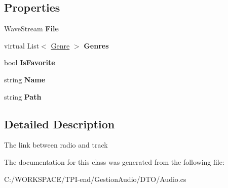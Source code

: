 \subsection*{Properties}
\begin{DoxyCompactItemize}
\item 
\mbox{\label{class_d_t_o_1_1_audio_a796dba75af345fa61826412a15b4f199}} 
Wave\+Stream {\bfseries File}
\item 
\mbox{\label{class_d_t_o_1_1_audio_a64baf5725332a6021eb88a2756f0f445}} 
virtual List$<$ \hyperlink{class_d_t_o_1_1_entity_1_1_genre}{Genre} $>$ {\bfseries Genres}
\item 
\mbox{\label{class_d_t_o_1_1_audio_acdff662b62eb37a7fe3f7950b9131c3b}} 
bool {\bfseries Is\+Favorite}
\item 
\mbox{\label{class_d_t_o_1_1_audio_acdcc82963e4ab0fef866fa1776023d02}} 
string {\bfseries Name}
\item 
\mbox{\label{class_d_t_o_1_1_audio_a0a8ec6ad3b10d7fd6adf59798b2f2d3a}} 
string {\bfseries Path}
\end{DoxyCompactItemize}


\subsection{Detailed Description}
The link between radio and track 



The documentation for this class was generated from the following file\+:\begin{DoxyCompactItemize}
\item 
C\+:/\+W\+O\+R\+K\+S\+P\+A\+C\+E/\+T\+P\+I-\/end/\+Gestion\+Audio/\+D\+T\+O/Audio.\+cs\end{DoxyCompactItemize}
